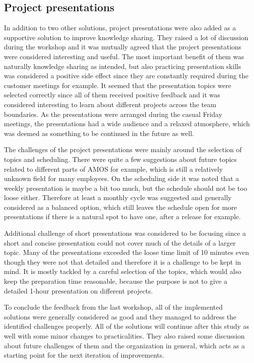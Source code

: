 \subsection{Project presentations}

In addition to two other solutions, project presentations were also added as a supportive solution to improve knowledge sharing. They raised a lot of discussion during the workshop and it was mutually agreed
that the project presentations were considered interesting and useful. The most important benefit of them was naturally knowledge sharing as intended, but also practicing presentation skills was considered
a positive side effect since they are constantly required during the customer meetings for example. It seemed that the presentation topics were selected correctly since all of them received positive feedback
and it was considered interesting to learn about different projects across the team boundaries. As the presentations were arranged during the casual Friday meetings, the presentations had a wide audience
and a relaxed atmosphere, which was deemed as something to be continued in the future as well.

The challenges of the project presentations were mainly around the selection of topics and scheduling. There were quite a few suggestions about future topics related to different parts of AMOS for example, which is
still a relatively unknown field for many employees. On the scheduling side it was noted that a weekly presentation is maybe a bit too much, but the schedule should not be too loose either. Therefore
at least a monthly cycle was suggested and generally considered as a balanced option, which still leaves the schedule open for more presentations if there is a natural spot to have one, after a release
for example.

Additional challenge of short presentations was considered to be focusing since a short and concise presentation could not cover much of the details of a larger topic. Many of the presentations
exceeded the loose time limit of 10 minutes even though they were not that detailed and therefore it is a challenge to be kept in mind. It is mostly tackled by a careful selection of the topics, which would
also keep the preparation time reasonable, because the purpose is not to give a detailed 1-hour presentation on different projects.

\vspace{12pt}

To conclude the feedback from the last workshop, all of the implemented solutions were generally considered as good and they managed to address the identified challenges properly.
All of the solutions will continue after this study as well with some minor changes to practicalities. They also raised some discussion about
future challenges of them and the organization in general, which acts as a starting point for the next iteration of improvements.